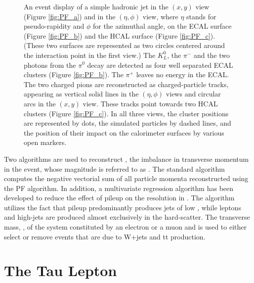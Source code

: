 \begin{figure}
	\caption{An event display of a simple hadronic jet in the $(x, y)$ view (Figure \ref{fig:PF_a}) and in the $(\eta,\phi)$ view, where $\eta$ stands for pseudo-rapidity and $\phi$ for the azimuthal angle, on the ECAL surface (Figure \ref{fig:PF_b}) and the HCAL surface (Figure \ref{fig:PF_c}). (These two surfaces are represented as two circles centered around the interaction point in the first view.) The $K^{0}_{L}$, the $\pi^{-}$ and the two photons from the $\pi^{0}$ decay are detected as four well separated ECAL clusters (Figure \ref{fig:PF_b}). The $\pi^{+}$ leaves no energy in the ECAL. The two charged pions are reconstructed as charged-particle tracks, appearing as vertical solid lines in the $(\eta,\phi)$ views and circular arcs in the $(x, y)$ view. These tracks point towards two HCAL clusters (Figure \ref{fig:PF_c}). In all three views, the cluster positions are represented by dots, the simulated particles by dashed lines, and the position of their impact on the calorimeter surfaces by various open markers.}
	\label{fig:PF_event_display}
\end{figure}


Two algorithms are used to reconstruct \ptvecmiss, the imbalance in transverse momentum in the event, whose magnitude is referred to as \met. The standard algorithm computes the negative vectorial sum of all particle momenta reconstructed using the PF algorithm. In addition, a multivariate regression algorithm \cite{Khachatryan:2014gga} has been developed to reduce the effect of pileup on the resolution in \met. The algorithm utilizes the fact that pileup predominantly produces jets of low \pt, while leptons and high-\pt jets are produced almost exclusively in the hard-scatter. The transverse mass, \mt, of the system constituted by an electron or a muon and \met is used to either select or remove events that are due to W+jets and tt production. 

\clearpage

\section {The Tau Lepton}

